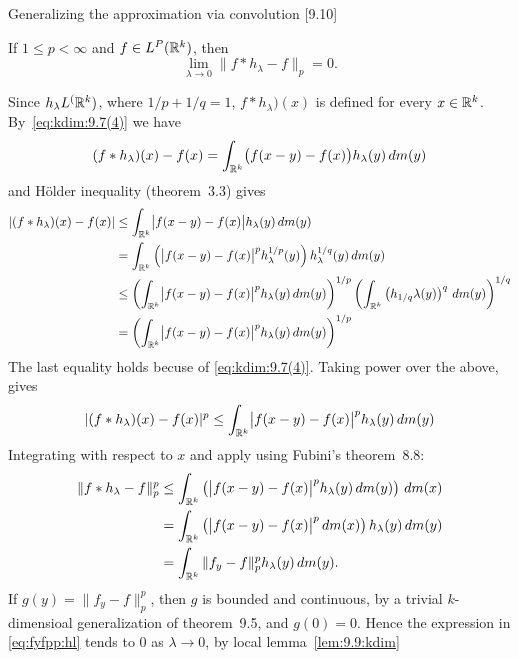 \begin{enumerate}
Generalizing the approximation via convolution [9.10]
\begin{llem} \label{lem:9.10:kdim}
If \(1\leq p < \infty\) and \(f\in L^P(\mathbb{R}^k)\), then
\begin{equation}
 \lim_{\lambda\to 0} \|f\ast h_\lambda - f\|_p = 0. \label{eq:9.10:kdim} 
\end{equation}
\end{llem}
\begin{thmproof}
Since \(h_\lambda L^(\mathbb{R}^k)\), where \(1/p+1/q=1\), 
\(f\ast h_\lambda)(x)\) is defined for every \(x\in\mathbb{R}^k\).
By~\eqref{eq:kdim:9.7(4)} we have
\begin{equation*}
(f\ast h_\lambda)(x) - f(x) 
= \int_{\mathbb{R}^k} \bigl(f(x-y)-f(x)\bigr)h_\lambda(y)\,dm(y)
\end{equation*}
and 
H\"older inequality (theorem~3.3) gives
\begin{align*}
|(f\ast h_\lambda)(x) - f(x)|
&\leq \int_{\mathbb{R}^k} \bigl|f(x-y)-f(x)\bigr|h_\lambda(y)\,dm(y) \\
&=    \int_{\mathbb{R}^k} \left(\bigl|f(x-y)-f(x)\bigr|^p 
           h_\lambda^{1/p}(y)\right) h_\lambda^{1/q}(y)
          \,dm(y) \\
&\leq 
  \left( \int_{\mathbb{R}^k} \bigl|f(x-y)-f(x)\bigr|^p
        h_\lambda(y) \,dm(y) \right)^{1/p} 
  \left(  \int_{\mathbb{R}^k} \left(h_{1/q}\lambda(y)\right)^q\,dm(y)\right)^{1/q} \\
&= \left( \int_{\mathbb{R}^k} \bigl|f(x-y)-f(x)\bigr|^p h_\lambda(y)
                     \,dm(y) \right)^{1/p}
\end{align*}
The last equality holds becuse of \eqref{eq:kdim:9.7(4)}.
Taking power over the above, gives
\begin{equation*}
|(f\ast h_\lambda)(x) - f(x)|^p
\leq \int_{\mathbb{R}^k} \bigl|f(x-y)-f(x)\bigr|^p h_\lambda(y) \,dm(y) 
\end{equation*}
Integrating with respect to $x$ and apply using Fubini's theorem~8.8:
\begin{align}
\| f\ast h_\lambda - f\|_p^p 
&\leq \int_{\mathbb{R}^k} \left(\bigl|f(x-y)-f(x)\bigr|^p h_\lambda(y) \,dm(y)
                 \right)\,dm(x) \notag \\
&= \int_{\mathbb{R}^k} \left(\bigl|f(x-y)-f(x)\bigr|^p \,dm(x)
                 \right) h_\lambda(y) \,dm(y) \notag \\
&= \int_{\mathbb{R}^k} \|f_y - f\|_p^p h_\lambda(y) \,dm(y). \label{eq:fyfpp:hl}
\end{align}
If \(g(y) = \|f_y - f\|_p^p\), then $g$ is bounded and continuous,
by a trivial $k$-dimensioal generalization of theorem~9.5, 
and \(g(0)=0\). Hence the expression in \eqref{eq:fyfpp:hl}
tends to $0$ as \(\lambda\to 0\), by local lemma~\ref{lem:9.9:kdim}
\end{thmproof}


\end{enumerate}
